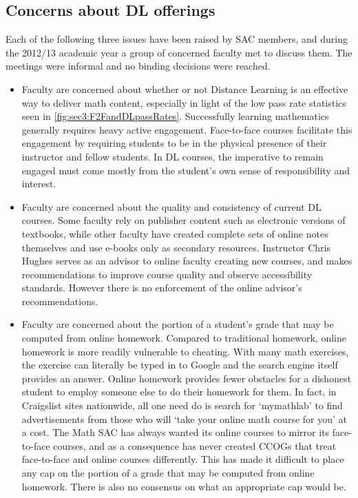 \subsection{Concerns about DL offerings}
Each of the following three issues have been raised by SAC members, and during
the 2012/13 academic year a group of concerned faculty met to discuss them. The
meetings were informal and no binding decisions were reached.
\begin{itemize}
	\item Faculty are concerned about whether or not Distance Learning is an
	effective way to deliver math content, especially in light of the low pass
	rate statistics seen in \cref{fig:sec3:F2FandDLpassRates}. Successfully
	learning mathematics generally requires heavy active engagement. Face-to-face
	courses facilitate this engagement by requiring students to be in the physical
	presence of their instructor and fellow students. In DL courses, the
	imperative to remain engaged must come mostly from the student's own sense of
	responsibility and interest.
	\item Faculty are concerned about the quality and consistency of current DL
	courses. Some faculty rely on publisher content such as electronic versions of
	textbooks, while other faculty have created complete sets of online notes
	themselves and use e-books only as secondary resources. Instructor Chris
	Hughes serves as an advisor to online faculty creating new courses, and makes
	recommendations to improve course quality and observe accessibility standards.
	However there is no enforcement of the online advisor's recommendations.
	\item Faculty are concerned about the portion of a student's grade that may be
	computed from online homework. Compared to traditional homework, online
	homework is more readily vulnerable to cheating. With many math exercises, the
	exercise can literally be typed in to Google and the search engine itself
	provides an answer. Online homework provides fewer obstacles for a dishonest
	student to employ someone else to do their homework for them. In fact, in
	Craigslist sites nationwide, all one need do is search for `mymathlab' to find
	advertisements from those who will `take your online math course for you' at a
	cost. The Math SAC has always wanted its online courses to mirror its
	face-to-face courses, and as a consequence has never created CCOGs that treat
	face-to-face and online courses differently. This has made it difficult to
	place any cap on the portion of a grade that may be computed from online
	homework. There is also no consensus on what an appropriate cap would be.
\end{itemize}

